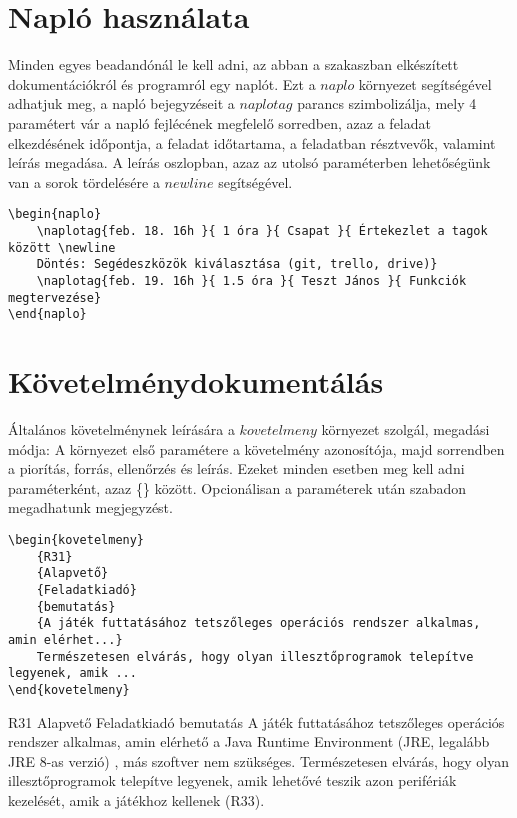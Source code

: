 \documentclass[]{article}
\begin{document}
\section{Napló használata}
Minden egyes beadandónál le kell adni, az abban a szakaszban elkészített dokumentációkról és programról egy naplót. Ezt a $naplo$ környezet segítségével adhatjuk meg, a napló bejegyzéseit a $naplotag$ parancs szimbolizálja, mely 4 paramétert vár a napló fejlécének megfelelő sorredben, azaz a feladat elkezdésének időpontja, a feladat időtartama, a feladatban résztvevők, valamint leírás megadása. A leírás oszlopban, azaz az utolsó paraméterben lehetőségünk van a sorok tördelésére a $newline$ segítségével.
\begin{lstlisting}
\begin{naplo}
    \naplotag{feb. 18. 16h }{ 1 óra }{ Csapat }{ Értekezlet a tagok között \newline 
    Döntés: Segédeszközök kiválasztása (git, trello, drive)}
    \naplotag{feb. 19. 16h }{ 1.5 óra }{ Teszt János }{ Funkciók megtervezése}
\end{naplo}
\end{lstlisting}
    \begin{naplo}
    \end{naplo}

\section{Követelménydokumentálás}
Általános követelménynek leírására a $kovetelmeny$ környezet szolgál, megadási módja:
A környezet első paramétere a követelmény azonosítója, majd sorrendben a piorítás, forrás, ellenőrzés és leírás. Ezeket minden esetben meg kell adni paraméterként, azaz \{\} között. Opcionálisan a paraméterek után szabadon megadhatunk megjegyzést.
\begin{lstlisting}
\begin{kovetelmeny}
    {R31}
    {Alapvető}
    {Feladatkiadó}
    {bemutatás}
    {A játék futtatásához tetszőleges operációs rendszer alkalmas, amin elérhet...}
    Természetesen elvárás, hogy olyan illesztőprogramok telepítve legyenek, amik ...
\end{kovetelmeny}
\end{lstlisting}
\begin{kovetelmeny}
    {R31}
    {Alapvető}
    {Feladatkiadó}
    {bemutatás}
    {A játék futtatásához tetszőleges operációs rendszer alkalmas, amin elérhető a Java Runtime Environment (JRE, legalább JRE 8-as verzió) , más szoftver nem szükséges.}
    Természetesen elvárás, hogy olyan illesztőprogramok telepítve legyenek, amik lehetővé teszik azon perifériák kezelését, amik a játékhoz kellenek (R33).
\end{kovetelmeny}
\end{document}
